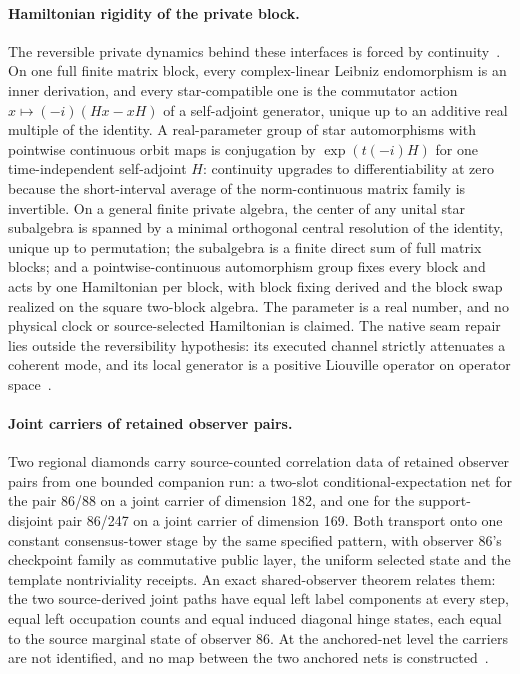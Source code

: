 \documentclass[11pt]{article}
\theoremstyle{remark}
\theoremstyle{plain}
\begin{document}
\paragraph{Hamiltonian rigidity of the private block.}
The reversible private dynamics behind these interfaces is forced by
continuity~\cite{ophrepo}. On one full finite matrix block, every
complex-linear Leibniz endomorphism is an inner derivation, and every
star-compatible one is the commutator action \(x\mapsto(-i)(Hx-xH)\) of a
self-adjoint generator, unique up to an additive real multiple of the
identity. A real-parameter group of star automorphisms with pointwise
continuous orbit maps is conjugation by \(\exp(t(-i)H)\) for one
time-independent self-adjoint \(H\): continuity upgrades to
differentiability at zero because the short-interval average of the
norm-continuous matrix family is invertible. On a general finite private
algebra, the center of any unital star subalgebra is spanned by a minimal
orthogonal central resolution of the identity, unique up to permutation;
the subalgebra is a finite direct sum of full matrix blocks; and a
pointwise-continuous automorphism group fixes every block and acts by one
Hamiltonian per block, with block fixing derived and the block swap
realized on the square two-block algebra. The parameter is a real number,
and no physical clock or source-selected Hamiltonian is claimed. The native
seam repair lies outside the reversibility hypothesis: its executed channel
strictly attenuates a coherent mode, and its local generator is a positive
Liouville operator on operator space~\cite{ophmodelguide}.




\paragraph{Joint carriers of retained observer pairs.}
Two regional diamonds carry source-counted correlation data of retained
observer pairs from one bounded companion run: a two-slot
conditional-expectation net for the pair 86/88 on a joint carrier of
dimension 182, and one for the support-disjoint pair 86/247 on a joint
carrier of dimension 169. Both transport onto one constant consensus-tower
stage by the same specified pattern, with observer 86's checkpoint family as
commutative public layer, the uniform selected state and the template
nontriviality receipts. An exact shared-observer theorem relates them: the
two source-derived joint paths have equal left label components at every
step, equal left occupation counts and equal induced diagonal hinge states,
each equal to the source marginal state of observer 86. At the anchored-net
level the carriers are not identified, and no map between the two anchored
nets is constructed~\cite{ophrepo}.
\end{document}
